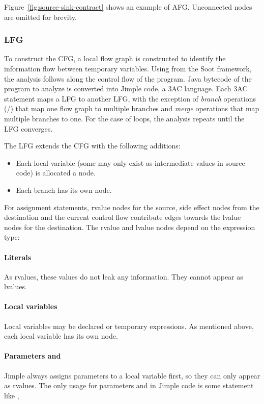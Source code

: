 Figure~\ref{fig:source-sink-contract} shows an example of \ac{AFG}.
Unconnected nodes are omitted for brevity.

\subsubsection{\acf{LFG}\label{subsubsec:lfg}}
To construct the \ac{CFG}, a local flow graph is constructed
to identify the information flow between temporary variables.
Using  from the Soot \cite{sootsurvivor} framework,
the analysis follows along the control flow of the program.
Java bytecode of the program to analyze is converted into Jimple code,
a \acf{3AC} language.
Each \ac{3AC} statement maps a \ac{LFG} to another \ac{LFG},
with the exception of \textit{branch} operations (/)
that map one flow graph to multiple branches
and \textit{merge} operations that map multiple branches to one.
For the case of loops,
the analysis repeats until the \ac{LFG} converges.

The \ac{LFG} extends the \ac{CFG} with the following additions:
\begin{itemize}
	\item Each local variable (some may only exist as intermediate values in source code)
		is allocated a node.
	\item Each branch has its own  node.
\end{itemize}

For assignment statements,
rvalue nodes for the source, side effect nodes from the destination
and the current control flow contribute edges towards the lvalue nodes for the destination.
The rvalue and lvalue nodes depend on the expression type:

\paragraph{Literals}
As rvalues, these values do not leak any information.
They cannot appear as lvalues.

\paragraph{Local variables}
Local variables may be declared or temporary expressions.
As mentioned above, each local variable has its own node.

\paragraph{Parameters and }
Jimple always assigns parameters to a local variable first,
so they can only appear as rvalues.
The only usage for parameters and  in Jimple code
is some statement like ,

